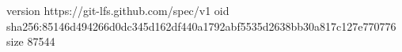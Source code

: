 version https://git-lfs.github.com/spec/v1
oid sha256:85146d494266d0dc345d162df440a1792abf5535d2638bb30a817c127e770776
size 87544
